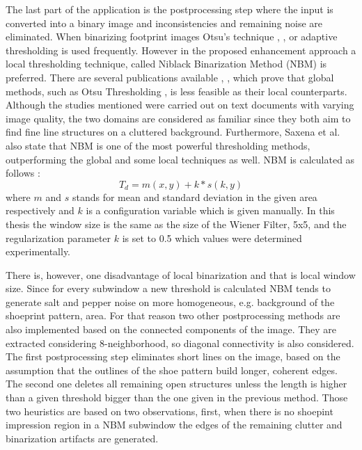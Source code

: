\documentclass[draft,final]{vutinfth} %
\begin{document}
\par
The last part of the application is the postprocessing step where the input is converted into a binary image and inconsistencies and remaining noise are eliminated.
When binarizing footprint images Otsu's technique \cite{algarni2008novel}, \cite{alizadeh2017automatic}, \cite{wu2019crime} or adaptive thresholding \cite{wang2014automatic} is used frequently.
However in the proposed enhancement approach a local thresholding technique, called Niblack Binarization Method (NBM) \cite{niblack1985introduction} is preferred.
There are several publications available \cite{som2011application}, \cite{athimethphat2011review}, which prove that global methods, such as Otsu Thresholding \cite{otsu1979threshold}, is less feasible as their local counterparts.
Although the studies mentioned were carried out on text documents with varying image quality, the two domains are considered as familiar since they both aim to find fine line structures on a cluttered background.
Furthermore, Saxena et al. \cite{saxena2019niblack} also state that NBM is one of the most powerful thresholding methods, outperforming the global and some local techniques as well. 
NBM  is calculated as follows \cite{saxena2019niblack}:
\[T_d = m(x,y) + k * s(k, y)\]
where $m$ and $s$ stands for mean and standard deviation in the given area respectively and $k$ is a configuration variable which is given manually. 
In this thesis the window size is the same as the size of the Wiener Filter, 5x5, and the regularization parameter $k$ is set to 0.5 which values were determined experimentally.
\par
There is, however, one disadvantage of local binarization and that is local window size.
Since for every subwindow a new threshold is calculated NBM tends to generate salt and pepper noise on more homogeneous, e.g. background of the shoeprint pattern, area.
For that reason two other postprocessing methods are also implemented based on the connected components of the image.
They are extracted considering 8-neighborhood, so diagonal connectivity is also considered.
The first postprocessing step eliminates short lines on the image, based on the assumption that the outlines of the shoe pattern build longer, coherent edges.
The second one deletes all remaining open structures unless the length is higher than a given threshold bigger than the one given in the previous method.
Those two heuristics are based on two observations, first,  when there is no shoepint impression region in a NBM subwindow the edges of the remaining clutter and binarization artifacts are generated.
\end{document}
